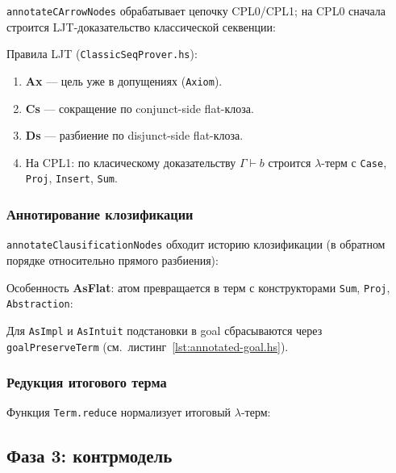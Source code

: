 \documentclass[a4paper,12pt]{article}
\newenvironment{listingcenter}{%
  \begin{center}\begin{minipage}{\linewidth}%
}{%
  \end{minipage}\end{center}%
}
\newcommand{\hssnippet}[2]{%
  \begin{listingcenter}%
  \end{listingcenter}}
\begin{document}
\texttt{annotateCArrowNodes} обрабатывает цепочку CPL0/CPL1; на CPL0 сначала
строится LJT-доказательство классической секвенции:
\hssnippet{annotate-carrow.hs}{Аннотирование шага CPL0 в \texttt{annotateCArrowNodes}}

Правила LJT (\texttt{ClassicSeqProver.hs}):
\hssnippet{ljt-rules.hs}{Дерево вывода LJT (\texttt{ClassicSeqProver.hs})}

\begin{enumerate}
  \item \textbf{Ax} --- цель уже в допущениях (\texttt{Axiom}).
  \item \textbf{Cs} --- сокращение по conjunct-side flat-клоза.
  \item \textbf{Ds} --- разбиение по disjunct-side flat-клоза.
  \item На CPL1: по класическому доказательству $\Gamma \vdash b$ строится
        $\lambda$-терм с \texttt{Case}, \texttt{Proj}, \texttt{Insert}, \texttt{Sum}.
\end{enumerate}

\subsubsection{Аннотирование клозификации}

\texttt{annotateClausificationNodes} обходит историю клозификации
(в обратном порядке относительно прямого разбиения):
\hssnippet{annotate-clausification.hs}{Обход истории в \texttt{annotateClausificationNodes}}

Особенность \textbf{AsFlat}: атом превращается в терм с конструкторами
\texttt{Sum}, \texttt{Proj}, \texttt{Abstraction}:
\hssnippet{annotate-asFlat.hs}{Аннотирование правила \texttt{AsFlat}}

Для \texttt{AsImpl} и \texttt{AsIntuit} подстановки в goal сбрасываются
через \texttt{goalPreserveTerm} (см.~листинг~\ref{lst:annotated-goal.hs}).

\subsubsection{Редукция итогового терма}

Функция \texttt{Term.reduce} нормализует итоговый $\lambda$-терм:
\hssnippet{term-reduce.hs}{Нормализация $\lambda$-термов: \texttt{Term.reduce}}

\subsection{Фаза 3: контрмодель}
\end{document}
